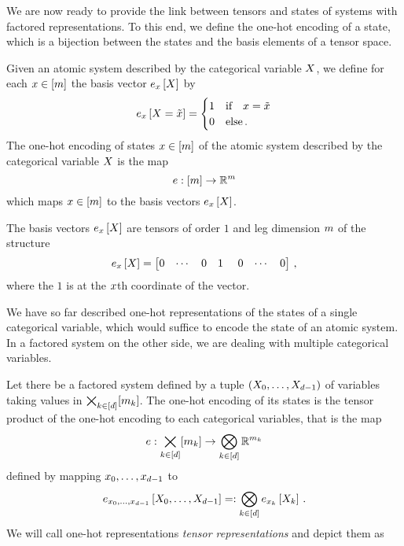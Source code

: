 We are now ready to provide the link between tensors and states of systems with factored representations.
To this end, we define the one-hot encoding of a state, which is a bijection between the states and the basis elements of a tensor space.

\begin{definition}
	Given an atomic system described by the categorical variable $X$, we define for each $x\in[m]$ the basis vector $e_{x}\left[X\right]$ by
	\begin{align}
		e_{x}\left[X=\tilde{x}\right] = \begin{cases}
			1 & \text{if} \quad x=\tilde{x} \\
			0 & \text{else} \, .
		\end{cases} 
	\end{align}
	The one-hot encoding of states $x\in[m]$ of the atomic system described by the categorical variable $X$ is the map
		\[ e: [m] \rightarrow \mathbb{R}^m \]
	which maps $x \in [m]$ to the basis vectors $e_{x}\left[X\right]$.
\end{definition}

The basis vectors $e_{x}\left[X\right]$ are tensors of order $1$ and leg dimension $m$ of the structure
\begin{align}
	\onehotmapofat{\catindex}{\catvariable} = \begin{bmatrix}
	0 & \cdots & 0 & 1 &  0 & \cdots & 0
	\end{bmatrix} \, ,
\end{align}
where the $1$ is at the $x$th coordinate of the vector.

We have so far described one-hot representations of the states of a single categorical variable, which would suffice to encode the state of an atomic system.
In a factored system on the other side, we are dealing with multiple categorical variables.

\begin{definition}
	Let there be a factored system defined by a tuple $(X_{0},\ldots,X_{d-1})$ of variables taking values in $\bigtimes_{k\in[d]}[m_{k}]$.
	The one-hot encoding of its states is the tensor product of the one-hot encoding to each categorical variables, that is the map
		\[ e : \bigtimes_{k\in[d]}[m_{k}] \rightarrow  \bigotimes_{k\in[d]} \mathbb{R}^{m_{k}} \]
	defined by mapping $x_{0},\ldots,x_{d-1}$ to
		\[ %
		 \onehotmapofat{\catindices}{\catvariables}
		=: \bigotimes_{\atomenumeratorin} \onehotmapofat{\catindexof{\atomenumerator}}{\catvariableof{\atomenumerator}} \, . \]
	We will call one-hot representations \emph{tensor representations} and depict them as
	\begin{center}
		
	\end{center}
\end{definition}



